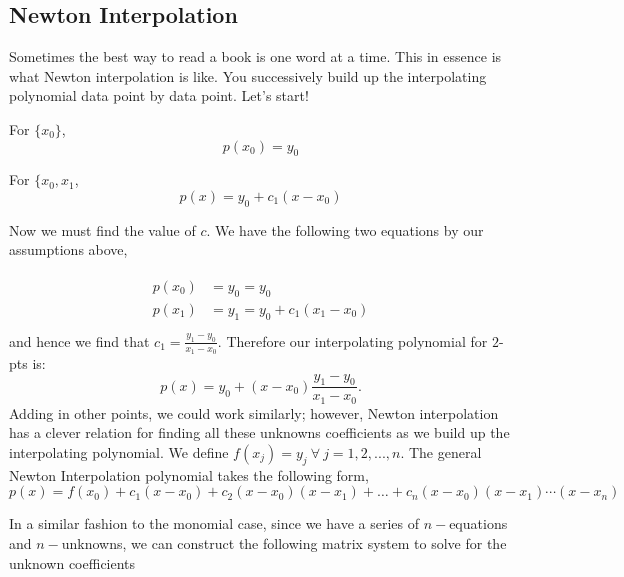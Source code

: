 \documentclass[paper=a4, fontsize=11pt]{scrartcl} %
\numberwithin{equation}{section} %
\numberwithin{figure}{section} %
\numberwithin{table}{section} %
\begin{document}
\subsection{Newton Interpolation}

 $ $ \\

Sometimes the best way to read a book is one word at a time. This in essence is what Newton interpolation is like. You successively build up the interpolating polynomial data point by data point. Let's start!

For $\{x_0\}$, $$p(x_0) = y_0$$

For $\{x_0,x_1$, $$p(x) = y_0 +  c_1 (x-x_0) $$

Now we must find the value of $c$. We have the following two equations by our assumptions above, 

\begin{align}
\nonumber
\begin{split}
p(x_0) &= y_0 = y_0 \\
p(x_1) &= y_1 = y_0 + c_1 (x_1-x_0) \\
\end{split}
\end{align}
and hence we find that $c_1 = \frac{y_1-y_0}{x_1-x_0}.$ Therefore our interpolating polynomial for $2$-pts is: $$p(x) = y_0 + (x-x_0)  \frac{y_1-y_0}{x_1-x_0}.$$ Adding in other points, we could work similarly; however, Newton interpolation has a clever relation for finding all these unknowns coefficients as we build up the interpolating polynomial. We define $f(x_j)=y_j\  \forall \ j=1,2,...,n$. The general Newton Interpolation polynomial takes the following form,
%
$$p(x) = f(x_0) + c_1 (x-x_0) + c_2(x-x_0)(x-x_1) + \ldots + c_n (x-x_0)(x-x_1)\cdots(x-x_n)$$

In a similar fashion to the monomial case, since we have a series of $n-$equations and $n-$unknowns, we can construct the following matrix system to solve for the unknown coefficients\\
\end{document}
